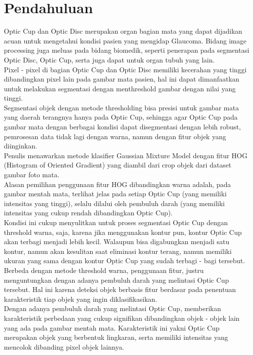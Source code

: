 \documentclass[]{IEEEphot}
\begin{document}
\section{Pendahuluan}

\noindent Optic Cup dan Optic Disc merupakan organ bagian mata yang dapat dijadikan acuan untuk mengetahui kondisi pasien yang mengidap Glaucoma. Bidang image processing juga meluas pada bidang biomedik, seperti penerapan pada segmentasi Optic Disc, Optic Cup, serta juga dapat untuk organ tubuh yang lain. \\

\noindent Pixel - pixel di bagian Optic Cup dan Optic Disc memiliki kecerahan yang tinggi dibandingkan pixel lain pada gambar mata pasien, hal ini dapat dimanfaatkan untuk melakukan segmentasi dengan menthreshold gambar dengan nilai yang tinggi. \\

\noindent Segmentasi objek dengan metode thresholding bisa presisi untuk gambar mata yang daerah terangnya hanya pada Optic Cup, sehingga agar Optic Cup pada gambar mata dengan berbagai kondisi dapat disegmentasi dengan lebih robust, pemrosesan data tidak lagi dengan warna, namun dengan fitur objek yang diinginkan. \\

\noindent Penulis menawarkan metode klasifier Gaussian Mixture Model dengan fitur HOG (Histogram of Oriented Gradient) yang diambil dari crop objek dari dataset gambar foto mata.\\

\noindent Alasan pemilihan penggunaan fitur HOG dibandingkan warna adalah, pada gambar mentah mata, terlihat jelas pada setiap Optic Cup (yang memiliki intensitas yang tinggi), selalu dilalui oleh pembuluh darah (yang memiliki intensitas yang cukup rendah dibandingkan Optic Cup).\\

\noindent Kondisi ini cukup menyulitkan untuk proses segmentasi Optic Cup dengan threshold warna, saja, karena jika menggunakan kontur pun, kontur Optic Cup akan terbagi menjadi lebih kecil. Walaupun bisa digabungkan menjadi satu kontur, namun akan kesulitan saat eliminasi kontur terang, namun memiliki ukuran yang sama dengan kontur Optic Cup yang sudah terbagi - bagi tersebut.\\

\noindent Berbeda dengan metode threshold warna, penggunaan fitur, justru menguntungkan dengan adanya pembuluh darah yang melintasi Optic Cup tersebut. Hal ini karena deteksi objek berbasis fitur berdasar pada penentuan karakteristik tiap objek yang ingin diklasifikasikan. \\
Dengan adanya pembuluh darah yang melintasi Optic Cup, memberikan karakteristik perbedaan yang cukup signifikan dibandingkan objek - objek lain yang ada pada gambar mentah mata. Karakteristik ini yakni Optic Cup merupakan objek yang berbentuk lingkaran, serta memiliki intensitas yang mencolok dibanding pixel objek lainnya.\\
\end{document}
